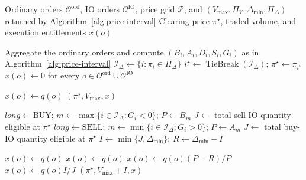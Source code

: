\begin{algorithm}[p]
\caption{IO admission and uniform-price allocation}
\label{alg:allocation}
\scriptsize
\begin{algorithmic}[1]
\Require Ordinary orders $\mathcal{O}^{\mathrm{ord}}$, IO orders
    $\mathcal{O}^{\mathrm{IO}}$, price grid $\mathcal{P}$, and
    $(V_{\max},\Pi_V,\Delta_{\min},\Pi_\Delta)$ returned by
    Algorithm~\ref{alg:price-interval}
\Ensure Clearing price $\pi^\star$, traded volume, and execution entitlements
    $x(o)$

\State Aggregate the ordinary orders and compute $(B_i,A_i,D_i,S_i,G_i)$ as
    in Algorithm~\ref{alg:price-interval}
\State $\mathcal{I}_\Delta\gets\{i:\pi_i\in\Pi_\Delta\}$
\State $i^\star\gets\operatorname{TieBreak}(\mathcal{I}_\Delta)$;
    $\pi^\star\gets\pi_{i^\star}$
    \label{line:close-price}
\State $x(o)\gets0$ for every
    $o\in\mathcal{O}^{\mathrm{ord}}\cup\mathcal{O}^{\mathrm{IO}}$

        \State $x(o)\gets q(o)$
    \EndFor
    \State \Return $(\pi^\star,V_{\max},x)$
        \label{line:close-balanced}
\EndIf

    \State $\mathit{long}\gets\mathrm{BUY}$;
        $m\gets\max\{i\in\mathcal{I}_\Delta:G_i<0\}$;
        $P\gets B_m$
    \State $J\gets$ total sell-IO quantity eligible at $\pi^\star$
\Else
    \State $\mathit{long}\gets\mathrm{SELL}$;
        $m\gets\min\{i\in\mathcal{I}_\Delta:G_i>0\}$;
        $P\gets A_m$
    \State $J\gets$ total buy-IO quantity eligible at $\pi^\star$
\EndIf
\State $I\gets\min\{J,\Delta_{\min}\}$;
    $R\gets\Delta_{\min}-I$
    \label{line:close-io-admission}

    \State $x(o)\gets q(o)$
\EndFor
{}
    \State $x(o)\gets q(o)$
\EndFor
{}
    \State $x(o)\gets q(o)(P-R)/P$
        \label{line:close-long-ration}
\EndFor
{}
        \State $x(o)\gets q(o)I/J$
            \label{line:close-io-ration}
    \EndFor
\EndIf
\State \Return $(\pi^\star,V_{\max}+I,x)$
    \label{line:close-return}
\end{algorithmic}
\end{algorithm}

